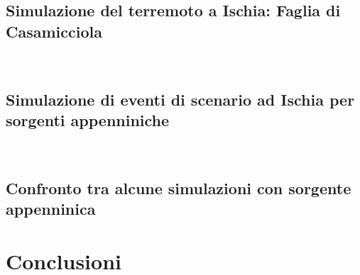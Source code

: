 \documentclass[a4paper,12pt,titlepage]{article}
\begin{document}
\subsection{Simulazione del terremoto a Ischia: Faglia di Casamicciola}
~\nocite{DeNovellis2018}
~\nocite{Strollo2015}
\subsection{ Simulazione di eventi di scenario ad Ischia per sorgenti appenniniche}
~\nocite{Costanzo2017}
\subsection{Confronto tra alcune simulazioni con sorgente appenninica}

\section*{Conclusioni}



\end{document}
